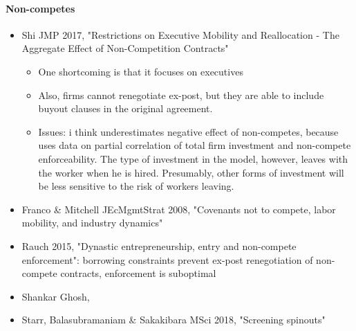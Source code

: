 \documentclass[12pt,english]{article}
\theoremstyle{remark}
\begin{document}
\paragraph{Non-competes}
\begin{itemize}
	\item Shi JMP 2017, "Restrictions on Executive Mobility and Reallocation - The Aggregate Effect of Non-Competition Contracts"
	\begin{itemize}
		\item One shortcoming is that it focuses on executives
		\item Also, firms cannot renegotiate ex-post, but they are able to include buyout clauses in the original agreement.
		\item Issues: i think underestimates negative effect of non-competes, because uses data on partial correlation of total firm investment and non-compete enforceability. The type of investment in the model, however, leaves with the worker when he is hired. Presumably, other forms of investment will be less sensitive to the risk of workers leaving. 
	\end{itemize}
	\item Franco \& Mitchell JEcMgmtStrat 2008, "Covenants not to compete, labor mobility, and industry dynamics"
	\item Rauch 2015, "Dynastic entrepreneurship, entry and non-compete enforcement": borrowing constraints prevent ex-post renegotiation of non-compete contracts, enforcement is suboptimal 
	\item Shankar Ghosh, 
	\item Starr, Balasubramaniam \& Sakakibara MSci 2018, "Screening spinouts"
\end{itemize}
\end{document}
